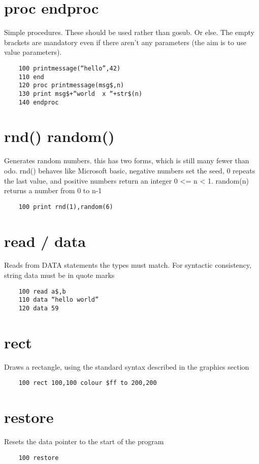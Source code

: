 \section*{proc endproc}
Simple procedures. These should be used rather than gosub. Or else.  The empty brackets are mandatory even if there aren’t any parameters (the aim is to use value parameters).
\example{}
\begin{verbatim}
	100 printmessage(“hello”,42)
	110 end
	120 proc printmessage(msg$,n)
	130 print msg$+“world  x “+str$(n)
	140 endproc
\end{verbatim}

\section*{rnd() random()}
Generates random numbers. this has two forms, which is still many fewer than odo. rnd() behaves like Microsoft basic, negative numbers set the seed,  0 repeats the last value, and positive numbers return an integer 0 <= n < 1. random(n) returns a number from 0 to n-1
\example{}
\begin{verbatim}
	100 print rnd(1),random(6)
\end{verbatim}

\section*{read / data}
Reads from DATA statements the types must match. For syntactic consistency, string data must be in quote marks
\example{}
\begin{verbatim}
	100 read a$,b
	110 data “hello world”
	120 data 59
\end{verbatim}

\section*{rect}
Draws a rectangle, using the standard syntax described in the graphics section
\example{}
\begin{verbatim}
	100 rect 100,100 colour $ff to 200,200
\end{verbatim}

\section*{restore}
Resets the data pointer to the start of the program
\example{}
\begin{verbatim}
	100 restore
\end{verbatim}

